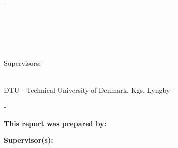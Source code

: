 \begin{titlingpage}
	\thispagestyle{empty}
	\enlargethispage{1.3cm}
	\calccentering{\unitlength}
	\begin{adjustwidth}{\unitlength-0.4cm}{-\unitlength-0.4cm}
		\begin{center}
			\vspace{1.5cm}
			{\Large\scshape\ThAuthors}\\[2cm]
			\begin{Spacing}{3}
				{\sffamily\HUGE\textbf{\ThTitleEN}}\\
				{\sffamily\Large{{\ThSubtitleEN}}}\\[1cm]
			\end{Spacing}
			\vspace{\stretch{2}}
			\begin{Spacing}{1.5}
				{\Large Supervisors:}\\
				{\Large\ThSupervisors\\}
			\end{Spacing}
			\vspace{\stretch{3}}
			{\sffamily DTU - Technical University of Denmark, Kgs. Lyngby - \ThYear}\\[1cm]
			\vspace{\stretch{4}}
		\end{center}
	\end{adjustwidth}

	\cleardoublepage
	\thispagestyle{empty}
	\calccentering{\unitlength}
	\begin{adjustwidth*}{\unitlength}{-\unitlength}
		\textbf{\ThTitleEN}
		\vspace{\stretch{1}}

		\noindent\textbf{This report was prepared by:}\\
		\ThAuthors


		\noindent\textbf{Supervisor(s):}\\
		\ThSupervisors


		\noindent\ThDepartment


\end{adjustwidth*}
\end{titlingpage}
